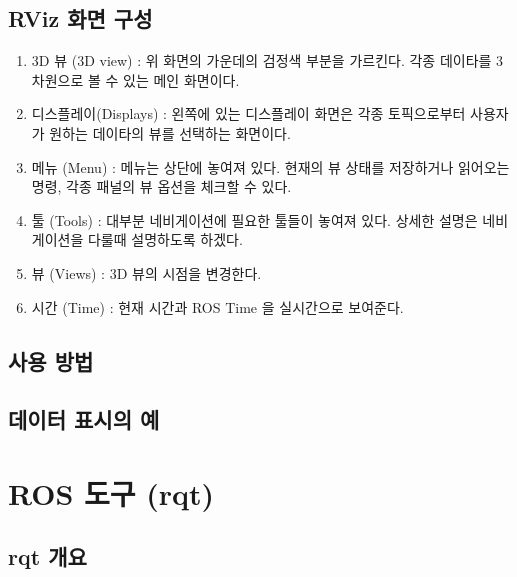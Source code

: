 \subsection{RViz 화면 구성}

\begin{enumerate}[leftmargin=*, label=\arabic{*})]
\item3D 뷰 (3D view)
: 위 화면의 가운데의 검정색 부분을 가르킨다. 각종 데이타를 3차원으로 볼 수 있는 메인 화면이다.

\item 디스플레이(Displays) 
: 왼쪽에 있는 디스플레이 화면은 각종 토픽으로부터 사용자가 원하는 데이타의 뷰를 선택하는 화면이다.

\item 메뉴 (Menu)
: 메뉴는 상단에 놓여져 있다. 현재의 뷰 상태를 저장하거나 읽어오는 명령, 각종 패널의 뷰 옵션을 체크할 수 있다.

\item 툴 (Tools)
: 대부분 네비게이션에 필요한 툴들이 놓여져 있다. 상세한 설명은 네비게이션을 다룰때 설명하도록 하겠다.

\item 뷰 (Views)
: 3D 뷰의 시점을 변경한다.

\item 시간 (Time)
: 현재 시간과 ROS Time 을 실시간으로 보여준다.
\end{enumerate}

\subsection{사용 방법}

\subsection{데이터 표시의 예}

\section{ROS 도구 (rqt) }

\subsection{rqt 개요}

